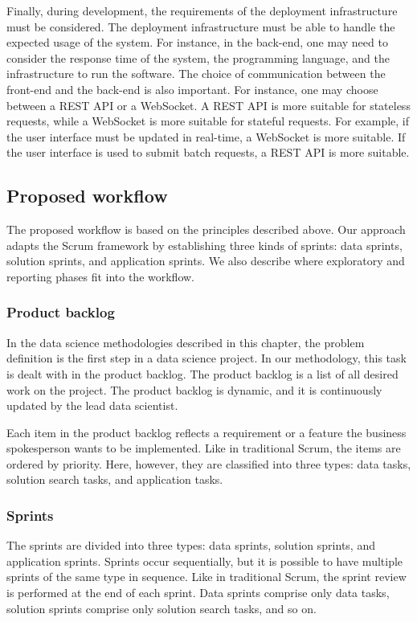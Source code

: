 Finally, during development, the requirements of the deployment infrastructure must be
considered.  The deployment infrastructure must be able to handle the expected usage
of the system.  For instance, in the back-end, one may need to consider the response time
of the system, the programming language, and the infrastructure to run the software.
The choice of communication between the front-end and the back-end is also important.
For instance, one may choose between a REST API or a WebSocket.  A REST API is more suitable
for stateless requests, while a WebSocket is more suitable for stateful requests.  For
example, if the user interface must be updated in real-time, a WebSocket is more suitable.
If the user interface is used to submit batch requests, a REST API is more suitable.

\subsection{Proposed workflow}
\label{sub:workflow}

The proposed workflow is based on the principles described above.  Our approach adapts
the Scrum framework by establishing three kinds of sprints: data sprints, solution sprints, and
application sprints.  We also describe where exploratory and reporting phases fit into the
workflow.

\subsubsection{Product backlog}

In the data science methodologies described in this chapter, the problem definition is the first step
in a data science project.  In our methodology, this task is dealt with in the product
backlog.  The product backlog is a list of all desired work on the project. The product
backlog is dynamic, and it is continuously updated by the
lead data scientist.

Each item in the product backlog reflects a requirement or a feature the business
spokesperson wants to be implemented.  Like in traditional Scrum, the items are ordered
by priority.  Here, however, they are classified into three types: data tasks, solution
search tasks, and application tasks.

\subsubsection{Sprints}

The sprints are divided into three types: data sprints, solution sprints, and application
sprints.  Sprints occur sequentially, but it is possible to have multiple sprints of the
same type in sequence.  Like in traditional Scrum, the sprint review is performed at the
end of each sprint.  Data sprints comprise only data tasks, solution sprints comprise only
solution search tasks, and so on.

